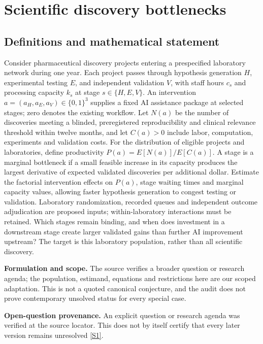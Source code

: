 \documentclass[11pt]{article}
\newcommand{\sref}[2]{\hyperlink{source:#1:#2}{[S#2]}}
\begin{document}
\section*{Scientific discovery bottlenecks}\label{30007692}
\subsection{Definitions and mathematical statement}
Consider pharmaceutical discovery projects entering a prespecified laboratory network during one year. Each project passes through hypothesis generation \(H\), experimental testing \(E\), and independent validation \(V\), with staff hours \(c_s\) and processing capacity \(k_s\) at stage \(s\in\{H,E,V\}\). An intervention \(a=(a_H,a_E,a_V)\in\{0,1\}^3\) supplies a fixed AI assistance package at selected stages; zero denotes the existing workflow. Let \(N(a)\) be the number of discoveries meeting a blinded, preregistered reproducibility and clinical relevance threshold within twelve months, and let \(C(a)>0\) include labor, computation, experiments and validation costs. For the distribution of eligible projects and laboratories, define productivity \(P(a)=E[N(a)]/E[C(a)]\). A stage is a marginal bottleneck if a small feasible increase in its capacity produces the largest derivative of expected validated discoveries per additional dollar. Estimate the factorial intervention effects on \(P(a)\), stage waiting times and marginal capacity values, allowing faster hypothesis generation to congest testing or validation. Laboratory randomization, recorded queues and independent outcome adjudication are proposed inputs; within-laboratory interactions must be retained. Which stages remain binding, and when does investment in a downstream stage create larger validated gains than further AI improvement upstream? The target is this laboratory population, rather than all scientific discovery.

\par\textbf{Formulation and scope.} The source verifies a broader question or research agenda; the population, estimand, equations and restrictions here are our scoped adaptation. This is not a quoted canonical conjecture, and the audit does not prove contemporary unsolved status for every special case.

\par\textbf{Open-question provenance.} An explicit question or research agenda was verified at the source locator. This does not by itself certify that every later version remains unresolved \sref{30007692}{1}.
\end{document}
